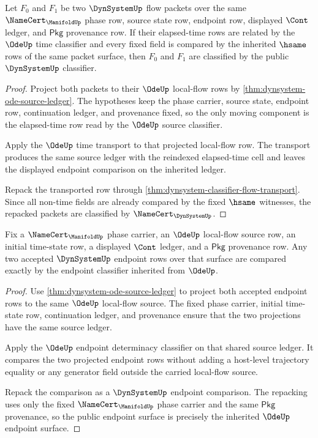 \begin{theorem}
\label{thm:dynsystem-time-reindex-stability}
Let $F_0$ and $F_1$ be two $\DynSystemUp$ flow packets over the same $\NameCert_{\ManifoldUp}$ phase row, source state row, endpoint row, displayed $\Cont$ ledger, and $\mathsf{Pkg}$ provenance row. If their elapsed-time rows are related by the $\OdeUp$ time classifier and every fixed field is compared by the inherited $\hsame$ rows of the same packet surface, then $F_0$ and $F_1$ are classified by the public $\DynSystemUp$ classifier.
\end{theorem}
\begin{proof}
Project both packets to their $\OdeUp$ local-flow rows by
\autoref{thm:dynsystem-ode-source-ledger}. The hypotheses keep the phase
carrier, source state, endpoint row, continuation ledger, and provenance
fixed, so the only moving component is the elapsed-time row read by the
$\OdeUp$ source classifier.

Apply the $\OdeUp$ time transport to that projected local-flow row. The
transport produces the same source ledger with the reindexed elapsed-time
cell and leaves the displayed endpoint comparison on the inherited ledger.

Repack the transported row through
\autoref{thm:dynsystem-classifier-flow-transport}. Since all non-time fields
are already compared by the fixed $\hsame$ witnesses, the repacked packets are
classified by $\NameCert_{\DynSystemUp}$.
\end{proof}

\begin{theorem}
\label{thm:dynsystem-endpoint-determinacy-surface}
Fix a $\NameCert_{\ManifoldUp}$ phase carrier, an $\OdeUp$ local-flow source row, an initial time-state row, a displayed $\Cont$ ledger, and a $\mathsf{Pkg}$ provenance row. Any two accepted $\DynSystemUp$ endpoint rows over that surface are compared exactly by the endpoint classifier inherited from $\OdeUp$.
\end{theorem}
\begin{proof}
Use \autoref{thm:dynsystem-ode-source-ledger} to project both accepted
endpoint rows to the same $\OdeUp$ local-flow source. The fixed phase carrier,
initial time-state row, continuation ledger, and provenance ensure that the
two projections have the same source ledger.

Apply the $\OdeUp$ endpoint determinacy classifier on that shared source
ledger. It compares the two projected endpoint rows without adding a
host-level trajectory equality or any generator field outside the carried
local-flow source.

Repack the comparison as a $\DynSystemUp$ endpoint comparison. The repacking
uses only the fixed $\NameCert_{\ManifoldUp}$ phase carrier and the same
$\mathsf{Pkg}$ provenance, so the public endpoint surface is precisely the
inherited $\OdeUp$ endpoint surface.
\end{proof}

